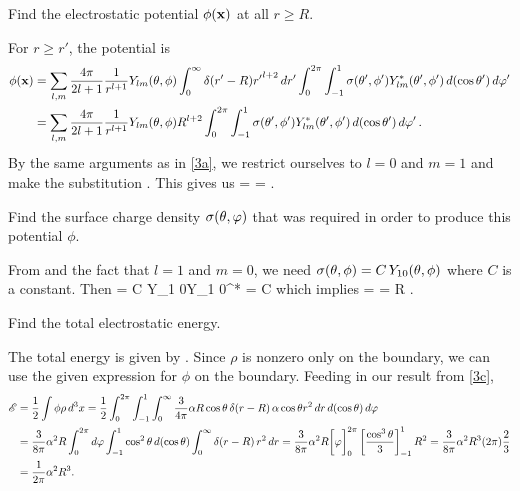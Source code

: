 \begin{problem} \label{3b}
	Find the electrostatic potential $\phi(\mathbf{x})$ at all $r \geq R$.
\end{problem}

\begin{solution}
	For $r \geq r'$, the potential is
	\begin{align*}
		\phi(\mathbf{x}) &= \sum_{l,m}\frac{4\pi}{2l + 1} \frac{1}{r^{l + 1}} Y_{l m}(\theta, \phi) \int_0^\infty \delta(r' - R) {r'}^{l+2} \dd{r'} \int_0^{2\pi} \int_{-1}^1 \sigma(\theta', \phi') Y_{l m}^*(\theta', \phi') \dd{(\cos\theta')} \dd{\varphi'} \\
		&= \sum_{l,m}\frac{4\pi}{2l + 1} \frac{1}{r^{l + 1}} Y_{l m}(\theta, \phi) R^{l+2} \int_0^{2\pi} \int_{-1}^1 \sigma(\theta', \phi') Y_{l m}^*(\theta', \phi') \dd{(\cos\theta')} \dd{\varphi'}.
	\end{align*}
	By the same arguments as in \ref{3a}, we restrict ourselves to $l = 0$ and $m = 1$ and make the substitution .  This gives us
	\beq
		\phix =    \cost {} 
		= \alp {} \cost.
	\eeq
\end{solution}
\vfix


\newcommand{\Er}{E_r}
\newcommand{\thh}{\boldsymbol{\hat{\tht}}}
\newcommand{\phh}{\boldsymbol{\hat{\vph}}}

\begin{problem} \label{3c}
	Find the surface charge density $\sigma(\theta, \varphi)$ that was required in order to produce this potential $\phi$.
\end{problem}

\begin{solution}
	From  and the fact that $l = 1$ and $m = 0$, we need $\sigma(\theta, \phi) = C \,Y_{1 0}(\theta, \phi)$ where $C$ is a constant.  Then
	\beq
		  = C \intotp \intono Y_{1 0}\tvp Y_{1 0}^*\tvp \dctp \dvp
		= C
	\eeq
	which implies
	\beq
		\sig\tv =    \cost =  \alpha R \cost.
	\eeq
\end{solution}
\vfix


\newcommand{\dr}{\dd{r}}
\newcommand{\dct}{\dd{(\cost)}}
\newcommand{\dph}{\dd{\vph}}

\begin{problem}
	Find the total electrostatic energy.
\end{problem}

\begin{solution}
	The total energy is given by .  Since $\rho$ is nonzero only on the boundary, we can use the given expression for $\phi$ on the boundary.  Feeding in our result from \ref{3c}, 
	\begin{align*}
		\sE &= \frac{1}{2} \int \phi \rho \dcx
		= \frac{1}{2} \intotp \intono \intoi \frac{3}{4\pi} \alp R \cost \, \delta(r - R) \, \alp \cost r^2 \dr \dct \dph \\
		&= \frac{3}{8\pi} \alp^2 R \intotp \dph \intono \cos^2\tht \dct \intoi \delta(r - R) \, r^2 \dr
		= \frac{3}{8\pi} \alp^2 R \bigg[ \vph \bigg]_0^{2\pi} \left[ \frac{\cos^3\tht}{3} \right]_{-1}^1 R^2
		= \frac{3}{8\pi} \alp^2 R^3 (2\pi) \frac{2}{3} \\
		&= \frac{1}{2\pi} \alp^2 R^3.
	\end{align*}
\end{solution}
\vfix